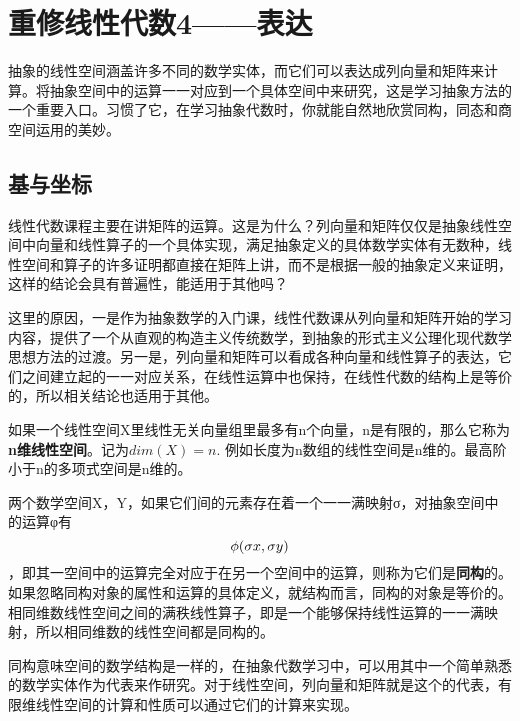 \chapter{重修线性代数4——表达} 
抽象的线性空间涵盖许多不同的数学实体，而它们可以表达成列向量和矩阵来计算。将抽象空间中的运算一一对应到一个具体空间中来研究，这是学习抽象方法的一个重要入口。习惯了它，在学习抽象代数时，你就能自然地欣赏同构，同态和商空间运用的美妙。

\section{基与坐标}

线性代数课程主要在讲矩阵的运算。这是为什么？列向量和矩阵仅仅是抽象线性空间中向量和线性算子的一个具体实现，满足抽象定义的具体数学实体有无数种，线性空间和算子的许多证明都直接在矩阵上讲，而不是根据一般的抽象定义来证明，这样的结论会具有普遍性，能适用于其他吗？

这里的原因，一是作为抽象数学的入门课，线性代数课从列向量和矩阵开始的学习内容，提供了一个从直观的构造主义传统数学，到抽象的形式主义公理化现代数学思想方法的过渡。另一是，列向量和矩阵可以看成各种向量和线性算子的表达，它们之间建立起的一一对应关系，在线性运算中也保持，在线性代数的结构上是等价的，所以相关结论也适用于其他。

如果一个线性空间X里线性无关向量组里最多有n个向量，n是有限的，那么它称为\textbf{n维线性空间}。记为$ dim(X)=n $.  例如长度为n数组的线性空间是n维的。最高阶小于n的多项式空间是n维的。

两个数学空间X，Y，如果它们间的元素存在着一个一一满映射σ，对抽象空间中的运算φ有 %
\[{\rm{ }}\phi (\sigma x,\sigma y)\] ，即其一空间中的运算完全对应于在另一个空间中的运算，则称为它们是\textbf{同构}的。如果忽略同构对象的属性和运算的具体定义，就结构而言，同构的对象是等价的。相同维数线性空间之间的满秩线性算子，即是一个能够保持线性运算的一一满映射，所以相同维数的线性空间都是同构的。

同构意味空间的数学结构是一样的，在抽象代数学习中，可以用其中一个简单熟悉的数学实体作为代表来作研究。对于线性空间，列向量和矩阵就是这个的代表，有限维线性空间的计算和性质可以通过它们的计算来实现。

